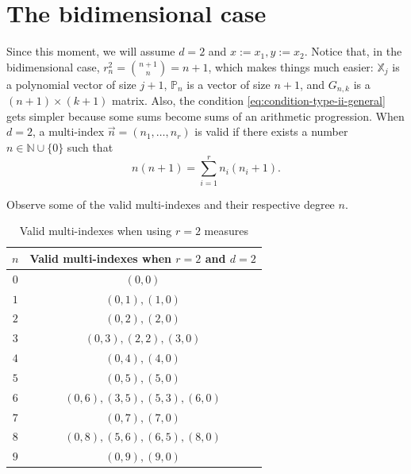 \documentclass[12pt,a4]{article}
\theoremstyle{plain}
\newcommand{\N}[0]{\mathbb{N}}
\begin{document}
\section{The bidimensional case}

Since this moment, we will assume $d=2$ and $x:=x_1, y:=x_2$. Notice that, in the bidimensional case, $r^2_n = \binom{n+1}{n} = n+1$, which makes things much easier: $\mathbb X_j$ is a polynomial vector of size $j+1$, $\mathbb P_n$ is a vector of size $n+1$, and $G_{n,k}$ is a $(n+1)\times(k+1)$ matrix. Also, the condition \eqref{eq:condition-type-ii-general} gets simpler because some sums become sums of an arithmetic progression. When $d=2$, a multi-index $\vec n =(n_1,\dots,n_r)$ is valid if there exists a number $n\in\N\cup \{0\}$ such that
\begin{equation}
    \label{eq:condition-type-ii}
    n(n+1)=\sum_{i=1}^r n_i (n_i+1).
\end{equation} 

Observe some of the valid multi-indexes and their respective degree $n$.

\begin{table}[h]
    \centering
    \begin{tabular}{|c|c|}
    \hline
    $n$ & Valid multi-indexes when $r=2$ and $d=2$ \\ \hline
    $0$ & $(0,0)$                                  \\ \hline
    $1$ & $(0,1), (1,0)$                           \\ \hline
    $2$ & $(0, 2), (2, 0)$                         \\ \hline
    $3$ & $(0, 3), (2, 2), (3, 0)$                 \\ \hline
    $4$ & $(0, 4), (4, 0)$                         \\ \hline
    $5$ & $(0, 5), (5, 0)$                         \\ \hline
    $6$ & $(0, 6), (3, 5), (5, 3), (6, 0)$         \\ \hline
    $7$ & $(0, 7), (7, 0)$                         \\ \hline
    $8$ & $(0, 8), (5, 6), (6, 5), (8, 0)$         \\ \hline
    $9$ & $(0, 9), (9, 0)$                         \\ \hline
    \end{tabular}
    \caption{Valid multi-indexes when using $r=2$ measures}
    \label{tab:2measuresindexes}
\end{table}
\end{document}
